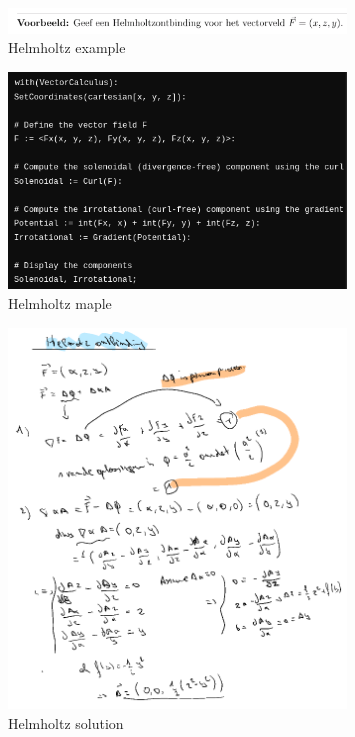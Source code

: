 \documentclass[a4paper]{article}
\begin{document}
\begin{figure}[H]
	\centering
	\includegraphics[width=0.8\textwidth]{assets/helmholtz_example.png}
	\caption{Helmholtz example}
	\label{fig:helmholtz_example}
\end{figure}

\begin{figure}[H]
	\centering
	\includegraphics[width=0.8\textwidth]{assets/helmholtz_maple.png}
	\caption{Helmholtz maple}
	\label{fig:helmholtz_maple}
\end{figure}

\begin{figure}[H]
	\centering
	\includegraphics[width=0.8\textwidth]{assets/helmholtz_sol.png}
	\caption{Helmholtz solution}
	\label{fig:helmholtz_sol}
\end{figure}
\end{document}
